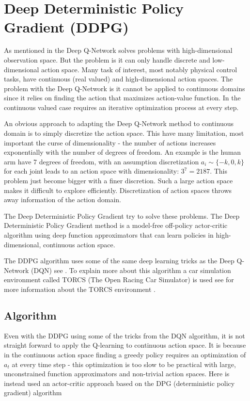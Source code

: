 \section{Deep Deterministic Policy Gradient (DDPG)}\label{DDPG}
As mentioned in  the Deep Q-Network solves problems with high-dimensional observation space. But the problem is it can only handle discrete and low-dimensional action space. Many task of interest, most notably physical control tasks, have continuous (real valued) and high-dimensional action spaces. The problem with the Deep Q-Network is it cannot be applied to continuous domains since it relies on finding the action that maximizes action-value function. In the continuous valued case requires an iterative optimization process at every step. \cite{DBLP:journals/corr/LillicrapHPHETS15}

An obvious approach to adapting the Deep Q-Network method to continuous domain is to simply discretize the action space. This have many limitation, most important the curse of dimensionality - the number of actions increases exponentially with the number of degrees of freedom. An example is the human arm have 7 degrees of freedom, with an assumption discretization $a_i \sim  \{-k,0,k\}$ for each joint leads to an action space with dimensionality: $3^7 = 2187$. This problem just become bigger with a finer discretion. Such a large action space makes it difficult to explore efficiently. Discretization of action spaces throws away information of the action domain. 

The Deep Deterministic Policy Gradient try to solve these problems. The Deep Deterministic Policy Gradient method is a model-free off-policy actor-critic algorithm using deep function approximators that can learn policies in high-dimensional, continuous action space. 

The DDPG algorithm uses some of the same deep learning tricks as the Deep Q-Network (DQN) see . To explain more about this algorithm a car simulation environment called TORCS (The Open Racing Car Simulator) is used see  for more information about the TORCS environment \cite{DDPG_Torcs}.

\subsection{Algorithm}
Even with the DDPG using some of the tricks from the DQN algorithm, it is not straight forward to apply the Q-learning to continuous action space. It is because in the continuous action space finding a greedy policy requires an optimization of \textit{$a_t$} at every time step - this optimization is too slow to be practical with large, unconstrained function approximators and non-trivial action spaces. Here is instead used an actor-critic approach based on the DPG (deterministic policy gradient) algorithm \cite{DBLP:conf/icml/SilverLHDWR14} 


